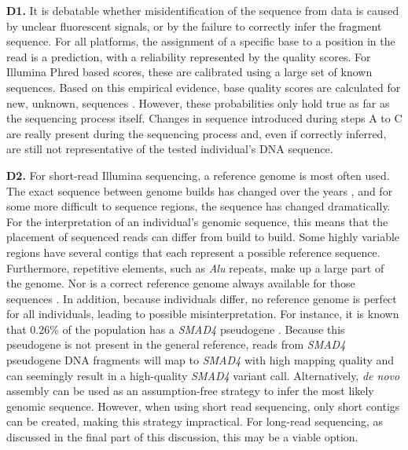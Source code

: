 \textbf{D1.} It is debatable whether misidentification of the sequence from data is caused by unclear fluorescent signals, or by the failure to correctly infer the fragment sequence. 
For all platforms, the assignment of a specific base to a position in the read is a prediction, with a reliability represented by the quality scores. 
For Illumina Phred based scores, these are calibrated using a large set of known sequences. 
Based on this empirical evidence, base quality scores are calculated for new, unknown, sequences \cite{Illumina_2011}.  
However, these probabilities only hold true as far as the sequencing process itself. 
Changes in sequence introduced during steps A to C are really present during the sequencing process and, even if correctly inferred, are still not representative of the tested individual’s DNA sequence. 


\textbf{D2.} For short-read Illumina sequencing, a reference genome is most often used. 
The exact sequence between genome builds has changed over the years \cite{Schneider_2017}, and for some more difficult to sequence regions, the sequence has changed dramatically. 
For the interpretation of an individual’s genomic sequence, this means that the placement of sequenced reads can differ from build to build. 
Some highly variable regions have several contigs that each represent a possible reference sequence. 
Furthermore, repetitive elements, such as \textsl{Alu} repeats, make up a large part of the genome. 
Nor is a correct reference genome always available for those sequences \cite{Wildschutte_2015}. 
In addition, because individuals differ, no reference genome is perfect for all individuals, leading to possible misinterpretation. 
For instance, it is known that 0.26\% of the population has a \textsl{SMAD4} pseudogene \cite{Millson_2015}. 
Because this pseudogene is not present in the general reference, reads from \textsl{SMAD4} pseudogene DNA fragments will map to \textsl{SMAD4} with high mapping quality and can seemingly result in a high-quality \textsl{SMAD4} variant call. 
Alternatively, \textsl{de novo} assembly can be used as an assumption-free strategy to infer the most likely genomic sequence. 
However, when using short read sequencing, only short contigs can be created, making this strategy impractical. 
For long-read sequencing, as discussed in the final part of this discussion, this may be a viable option.

